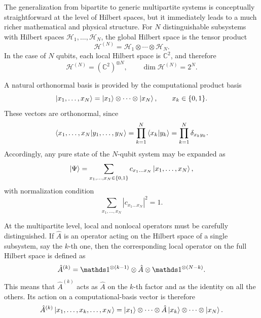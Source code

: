 The generalization from bipartite to generic multipartite systems is conceptually straightforward at the level of Hilbert spaces, but it immediately leads to a much richer mathematical and physical structure. For \(N\) distinguishable subsystems with Hilbert spaces \(\mathcal{H}_1,\dots,\mathcal{H}_N\), the global Hilbert space is the tensor product
\begin{equation}
	\mathcal{H}^{(N)}=\mathcal{H}_1\otimes\cdots\otimes\mathcal{H}_N.
	\label{eq:intro_qm_multipartite_hilbert_space}
\end{equation}
In the case of \(N\) qubits, each local Hilbert space is \(\mathds{C}^2\), and therefore
\begin{equation}
	\mathcal{H}^{(N)}=(\mathds{C}^2)^{\otimes N},
	\qquad
	\dim \mathcal{H}^{(N)}=2^N.
	\label{eq:intro_qm_n_qubit_hilbert_space_recalled}
\end{equation}

A natural orthonormal basis is provided by the computational product basis
\begin{equation}
	\ket{x_1,\dots,x_N}
	=
	\ket{x_1}\otimes\cdots\otimes\ket{x_N},
	\qquad
	x_k\in\{0,1\}.
	\label{eq:intro_qm_n_qubit_computational_basis}
\end{equation}
These vectors are orthonormal, since
\begin{equation}
	\braket{x_1,\dots,x_N}{y_1,\dots,y_N}
	=
	\prod_{k=1}^{N}\braket{x_k}{y_k}
	=
	\prod_{k=1}^{N}\delta_{x_k y_k}.
	\label{eq:intro_qm_n_qubit_basis_orthonormality}
\end{equation}
Accordingly, any pure state of the \(N\)-qubit system may be expanded as
\begin{equation}
	\ket{\Psi}
	=
	\sum_{x_1,\dots,x_N\in\{0,1\}}
	c_{x_1\dots x_N}\ket{x_1,\dots,x_N},
	\label{eq:intro_qm_n_qubit_generic_state}
\end{equation}
with normalization condition
\begin{equation}
	\sum_{x_1,\dots,x_N}|c_{x_1\dots x_N}|^2=1.
	\label{eq:intro_qm_n_qubit_generic_state_normalization}
\end{equation}

At the multipartite level, local and nonlocal operators must be carefully distinguished. If \(\hat A\) is an operator acting on the Hilbert space of a single subsystem, say the \(k\)-th one, then the corresponding local operator on the full Hilbert space is defined as
\begin{equation}
	\hat A^{(k)}
	=
	\id^{\otimes (k-1)}\otimes \hat A \otimes \id^{\otimes (N-k)}.
	\label{eq:intro_qm_local_operator_site_k}
\end{equation}
This means that \(\hat A^{(k)}\) acts as \(\hat A\) on the \(k\)-th factor and as the identity on all the others. Its action on a computational-basis vector is therefore
\begin{equation}
	\hat A^{(k)}\ket{x_1,\dots,x_k,\dots,x_N}
	=
	\ket{x_1}\otimes\cdots\otimes \hat A\ket{x_k}\otimes\cdots\otimes\ket{x_N}.
	\label{eq:intro_qm_local_operator_action_basis_state}
\end{equation}

